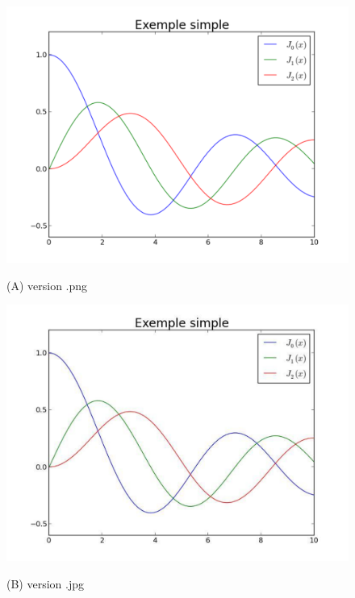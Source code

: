 \begin{figure}[htb]
\begin{minipage}[b]{0.33\linewidth}
  \centering
 \centerline{\includegraphics[clip,viewport=400 300 520 450,width=1.\textwidth]{example_simple_png}}
  \vspace{0.1cm}
  \centerline{(A) version .png}\medskip
\end{minipage}
\hfill
\begin{minipage}[b]{.33\linewidth}
  \centering
 \centerline{\includegraphics[clip=true,viewport=550 410 729 590,width=1.\textwidth]{example_simple_jpg}}
  \vspace{0.1cm}
  \centerline{(B) version .jpg}\medskip
\end{minipage}%

\end{figure}
